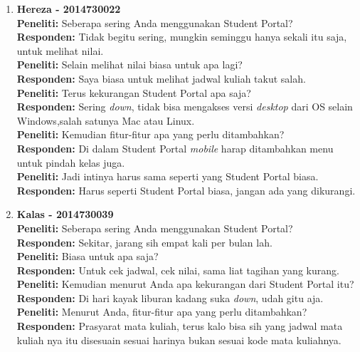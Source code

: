 \begin{enumerate}
	\item\textbf{Hereza - 2014730022}\\
	\textbf{Peneliti:} Seberapa sering Anda menggunakan Student Portal?\\
	\textbf{Responden:} Tidak begitu sering, mungkin seminggu hanya sekali itu saja, untuk melihat nilai.\\
	\textbf{Peneliti:} Selain melihat nilai biasa untuk apa lagi?\\
	\textbf{Responden:} Saya biasa untuk melihat jadwal kuliah takut salah.\\
	\textbf{Peneliti:} Terus kekurangan Student Portal apa saja?\\
	\textbf{Responden:} Sering \textit{down}, tidak bisa mengakses versi \textit{desktop} dari OS selain Windows,salah satunya Mac atau Linux.\\
	\textbf{Peneliti:} Kemudian fitur-fitur apa yang perlu ditambahkan?\\
	\textbf{Responden:} Di dalam Student Portal \textit{mobile} harap ditambahkan menu untuk pindah kelas juga.\\
	\textbf{Peneliti:} Jadi intinya harus sama seperti yang Student Portal biasa.\\
	\textbf{Responden:} Harus seperti Student Portal biasa, jangan ada yang dikurangi.\\
	
	\item\textbf{Kalas - 2014730039}\\
	\textbf{Peneliti:} Seberapa sering Anda menggunakan Student Portal?\\
	\textbf{Responden:} Sekitar, jarang sih empat kali per bulan lah.\\
	\textbf{Peneliti:} Biasa untuk apa saja?\\
	\textbf{Responden:} Untuk cek jadwal, cek nilai, sama liat tagihan yang kurang.\\
	\textbf{Peneliti:} Kemudian menurut Anda apa kekurangan dari Student Portal itu?\\
	\textbf{Responden:} Di hari kayak liburan kadang suka \textit{down}, udah gitu aja.\\
	\textbf{Peneliti:} Menurut Anda, fitur-fitur apa yang perlu ditambahkan?\\
	\textbf{Responden:} Prasyarat mata kuliah, terus kalo bisa sih yang jadwal mata kuliah nya itu disesuain sesuai harinya bukan sesuai kode mata kuliahnya.\\
	

\end{enumerate}
